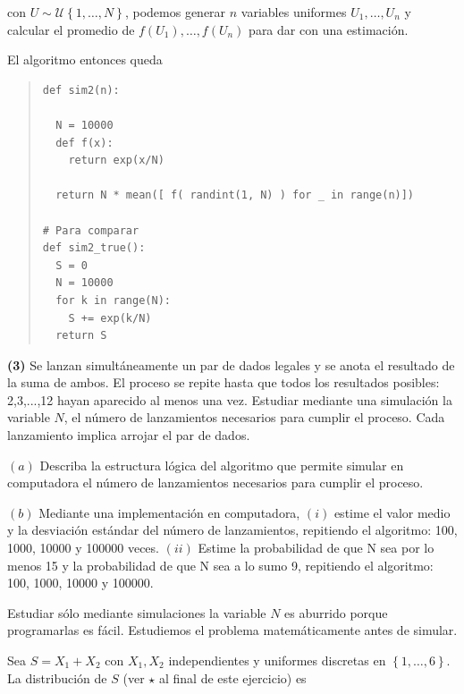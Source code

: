\documentclass[a4paper, 12pt]{article}
\begin{document}
con $U \sim \mathcal{U}\left\{ 1,\ldots, N \right\}  $, podemos generar $n$ variables
uniformes $U_1, \ldots, U_n$ y calcular el promedio de $f(U_1), \ldots, f(U_n)$
para dar con una estimación.

El algoritmo entonces queda 


\small
\begin{quote}

\begin{verbatim}
def sim2(n):

  N = 10000
  def f(x):
    return exp(x/N)

  return N * mean([ f( randint(1, N) ) for _ in range(n)])

# Para comparar
def sim2_true():
  S = 0
  N = 10000
  for k in range(N):
    S += exp(k/N)
  return S
\end{verbatim}

\end{quote}
\normalsize

\pagebreak

\begin{myframe}
  \textbf{(3)} Se lanzan simultáneamente un par de dados legales y se anota el
  resultado de la suma de ambos. El proceso se repite hasta que todos los
  resultados posibles: 2,3,...,12 hayan aparecido al menos una vez. Estudiar
  mediante una simulación la variable $N$, el número de lanzamientos necesarios
  para cumplir el proceso. Cada lanzamiento implica arrojar el par de dados. 

  $(a)$ Describa la estructura lógica del algoritmo que permite simular en computadora
  el número de lanzamientos necesarios para cumplir el proceso. 

  $(b)$ Mediante una
  implementación en computadora, $(i)$ estime el valor medio y la desviación
  estándar del número de lanzamientos, repitiendo el algoritmo: 100, 1000, 10000
  y 100000 veces. $(ii)$ Estime la probabilidad de que N sea por lo menos 15 y la
  probabilidad de que N sea a lo sumo 9, repitiendo el algoritmo: 100, 1000,
  10000 y 100000.
\end{myframe}

Estudiar sólo mediante simulaciones la variable $N$ es aburrido porque
programarlas es fácil. Estudiemos el problema matemáticamente antes de simular. 

Sea $S = X_1 + X_2$ con $X_1, X_2$ independientes y uniformes discretas en
$\left\{ 1,\ldots, 6 \right\} $. La distribución de $S$ (ver 
$\star$ al final de este ejercicio) es
\end{document}
